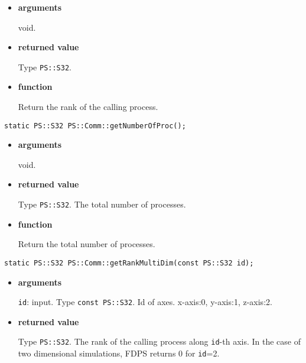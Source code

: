 \begin{itemize}

\item{\bf arguments}

void.

\item{\bf returned value}

Type {\tt PS::S32}.

\item{\bf function}

Return the rank of the calling process.

\end{itemize}


\begin{screen}
\begin{verbatim}
static PS::S32 PS::Comm::getNumberOfProc();
\end{verbatim}
\end{screen}

\begin{itemize}

\item{\bf arguments}

void.

\item{\bf returned value}

Type {\tt PS::S32}. The total number of processes.

\item{\bf function}

Return the total number of processes.

\end{itemize}


\begin{screen}
\begin{verbatim}
static PS::S32 PS::Comm::getRankMultiDim(const PS::S32 id);
\end{verbatim}
\end{screen}

\begin{itemize}

\item{\bf arguments}

{\tt id}: input. Type {\tt const PS::S32}. Id of axes. x-axis:0,
y-axis:1, z-axis:2.

\item{\bf returned value}

Type {\tt PS::S32}. The rank of the calling process along {\tt id}-th
axis. In the case of two dimensional simulations, FDPS returns 0 for
{\tt id}=2.


\end{itemize}

